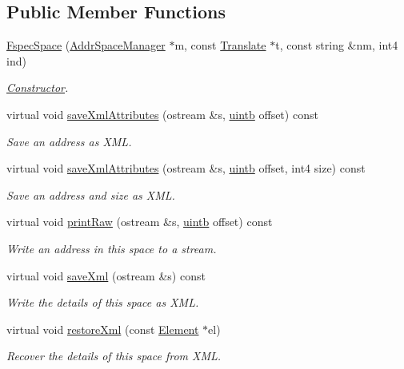 \subsection*{Public Member Functions}
\begin{DoxyCompactItemize}
\item 
\mbox{\hyperlink{class_fspec_space_a186ef2f65e61428b3cc12689b588cf1c}{Fspec\+Space}} (\mbox{\hyperlink{class_addr_space_manager}{Addr\+Space\+Manager}} $\ast$m, const \mbox{\hyperlink{class_translate}{Translate}} $\ast$t, const string \&nm, int4 ind)
\begin{DoxyCompactList}\small\item\em \mbox{\hyperlink{class_constructor}{Constructor}}. \end{DoxyCompactList}\item 
virtual void \mbox{\hyperlink{class_fspec_space_ad68a1bf048371fd9e5b4acb2b4bbf36c}{save\+Xml\+Attributes}} (ostream \&s, \mbox{\hyperlink{types_8h_a2db313c5d32a12b01d26ac9b3bca178f}{uintb}} offset) const
\begin{DoxyCompactList}\small\item\em Save an address as X\+ML. \end{DoxyCompactList}\item 
virtual void \mbox{\hyperlink{class_fspec_space_a668ef71841767a6d0b935831c14358fe}{save\+Xml\+Attributes}} (ostream \&s, \mbox{\hyperlink{types_8h_a2db313c5d32a12b01d26ac9b3bca178f}{uintb}} offset, int4 size) const
\begin{DoxyCompactList}\small\item\em Save an address and size as X\+ML. \end{DoxyCompactList}\item 
virtual void \mbox{\hyperlink{class_fspec_space_a48b1e30f1554fd950f5c240407ca20db}{print\+Raw}} (ostream \&s, \mbox{\hyperlink{types_8h_a2db313c5d32a12b01d26ac9b3bca178f}{uintb}} offset) const
\begin{DoxyCompactList}\small\item\em Write an address in this space to a stream. \end{DoxyCompactList}\item 
virtual void \mbox{\hyperlink{class_fspec_space_a3e1fd8f03e6fc9685988a070097b6b5a}{save\+Xml}} (ostream \&s) const
\begin{DoxyCompactList}\small\item\em Write the details of this space as X\+ML. \end{DoxyCompactList}\item 
virtual void \mbox{\hyperlink{class_fspec_space_ad0061e3e6e13bdd7349f643e44d8947d}{restore\+Xml}} (const \mbox{\hyperlink{class_element}{Element}} $\ast$el)
\begin{DoxyCompactList}\small\item\em Recover the details of this space from X\+ML. \end{DoxyCompactList}\end{DoxyCompactItemize}
